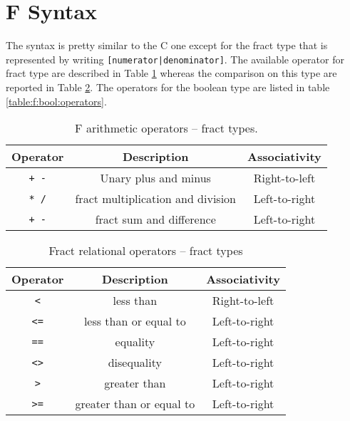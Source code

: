 \section{F Syntax}
The syntax is pretty similar to the C one except for the fract type that
is represented by writing \verb![numerator|denominator]!.
The available operator for fract type are described in Table
\ref{table:f:fract:operators} whereas the comparison on this type are reported
in Table \ref{table:f:fract:comparison:operators}.
The operators for the boolean type are listed in table 
\ref{table:f:bool:operators}.




\begin{table}[h]
\centering
\begin{tabular}{|c|c|c|}
\hline
\textbf{Operator} & \textbf{Description} & \textbf{Associativity} \\ 
\hline
\verb|+ -| & Unary plus and minus 	& Right-to-left	\\
\verb|* /| & fract multiplication and division & Left-to-right \\ 
\verb|+ -| & fract sum and difference & Left-to-right \\
\hline
\end{tabular}
\caption{F arithmetic operators -- fract types.}
\label{table:f:fract:operators}


\end{table}

\begin{table}[h]
\centering
\begin{tabular}{|c|c|c|}
\hline
\textbf{Operator} & \textbf{Description} & \textbf{Associativity} \\ 
\hline
\verb|<|	& less than	& Right-to-left	\\
\verb|<=|	& less than or equal to	& Left-to-right \\ 
\verb|==|	& equality & Left-to-right \\
\verb|<>|	& disequality & Left-to-right \\
\verb|>|	& greater than & Left-to-right\\
\verb|>=|	& greater than or equal to & Left-to-right \\
\hline
\end{tabular}
\caption{Fract relational operators -- fract types}
\label{table:f:fract:comparison:operators}
\end{table}



